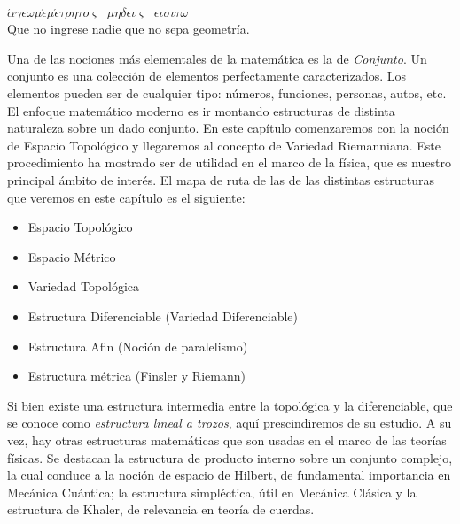 
\begin{epigrafe}
$\acute{\alpha} \gamma\epsilon \omega \mu \acute{\epsilon} \mu \acute{\epsilon} \tau \rho \eta \tau o \varsigma \;\; \mu \eta \delta
\epsilon \iota \varsigma \;\; \epsilon \iota \sigma \iota \tau \omega$  \\
Que no ingrese nadie que no sepa geometr\'ia.
\end{epigrafe}





\label{s:3.1}

Una de las nociones m\'as elementales de la matem\'atica es la de {\it Conjunto}. Un conjunto es una colecci\'on de elementos perfectamente caracterizados. Los elementos pueden ser de cualquier tipo: n\'umeros, funciones, personas, autos, etc. El enfoque matem\'atico moderno es ir montando estructuras de distinta naturaleza sobre un dado conjunto. En este cap\'itulo comenzaremos con la noci\'on de Espacio Topol\'ogico y llegaremos al concepto de Variedad Riemanniana. Este procedimiento ha mostrado ser de utilidad en el marco de la f\'isica, que es nuestro principal \'ambito de inter\'es.
El mapa de ruta de las de las distintas estructuras que veremos en este cap\'itulo es el siguiente:
\begin{itemize}
\item Espacio Topol\'ogico
\item Espacio M\'etrico
\item Variedad Topol\'ogica
\item Estructura Diferenciable (Variedad Diferenciable)
\item Estructura Afin (Noci\'on de paralelismo)
\item Estructura m\'etrica (Finsler y Riemann)
\end{itemize}

Si bien existe una estructura intermedia entre la topol\'ogica y la diferenciable, que se conoce como {\it estructura lineal a trozos}, aquí prescindiremos de su estudio. A su vez, hay otras estructuras matem\'aticas que son usadas en el marco de las teor\'ias f\'isicas. Se destacan la estructura de producto interno sobre un conjunto complejo, la cual conduce a la noci\'on de espacio de Hilbert, de fundamental importancia en Mec\'anica Cu\'antica; la estructura simpl\'ectica, \'util en Mec\'anica Cl\'asica y la estructura de Khaler, de relevancia en teor\'ia de cuerdas.

